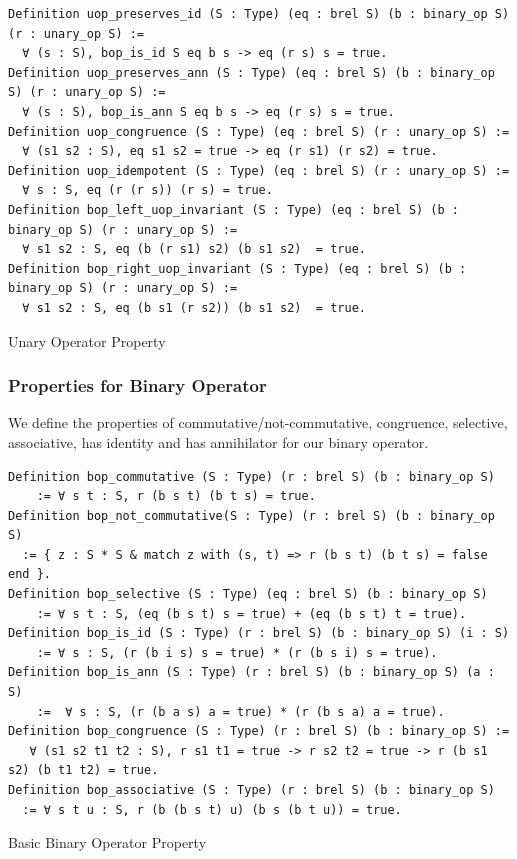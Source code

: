 \documentclass[a4paper,12pt,twoside,openright]{report}
\begin{document}
\begin{listing}[H]
\begin{verbatim}
Definition uop_preserves_id (S : Type) (eq : brel S) (b : binary_op S) (r : unary_op S) :=
  ∀ (s : S), bop_is_id S eq b s -> eq (r s) s = true.
Definition uop_preserves_ann (S : Type) (eq : brel S) (b : binary_op S) (r : unary_op S) :=
  ∀ (s : S), bop_is_ann S eq b s -> eq (r s) s = true.
Definition uop_congruence (S : Type) (eq : brel S) (r : unary_op S) := 
  ∀ (s1 s2 : S), eq s1 s2 = true -> eq (r s1) (r s2) = true. 
Definition uop_idempotent (S : Type) (eq : brel S) (r : unary_op S) := 
  ∀ s : S, eq (r (r s)) (r s) = true. 
Definition bop_left_uop_invariant (S : Type) (eq : brel S) (b : binary_op S) (r : unary_op S) :=
  ∀ s1 s2 : S, eq (b (r s1) s2) (b s1 s2)  = true.
Definition bop_right_uop_invariant (S : Type) (eq : brel S) (b : binary_op S) (r : unary_op S) :=
  ∀ s1 s2 : S, eq (b s1 (r s2)) (b s1 s2)  = true.
\end{verbatim}
\caption{Unary Operator Property} 
\label{coq:def:uop_properties}
\end{listing}

\subsubsection{Properties for Binary Operator}
We define the properties of commutative/not-commutative, congruence, selective, associative, has identity and has annihilator for our binary operator.

\begin{listing}[H]
\begin{verbatim}
Definition bop_commutative (S : Type) (r : brel S) (b : binary_op S) 
    := ∀ s t : S, r (b s t) (b t s) = true. 
Definition bop_not_commutative(S : Type) (r : brel S) (b : binary_op S) 
  := { z : S * S & match z with (s, t) => r (b s t) (b t s) = false end }.  
Definition bop_selective (S : Type) (eq : brel S) (b : binary_op S) 
    := ∀ s t : S, (eq (b s t) s = true) + (eq (b s t) t = true).    
Definition bop_is_id (S : Type) (r : brel S) (b : binary_op S) (i : S) 
    := ∀ s : S, (r (b i s) s = true) * (r (b s i) s = true).    
Definition bop_is_ann (S : Type) (r : brel S) (b : binary_op S) (a : S)
    :=  ∀ s : S, (r (b a s) a = true) * (r (b s a) a = true).    
Definition bop_congruence (S : Type) (r : brel S) (b : binary_op S) := 
   ∀ (s1 s2 t1 t2 : S), r s1 t1 = true -> r s2 t2 = true -> r (b s1 s2) (b t1 t2) = true.
Definition bop_associative (S : Type) (r : brel S) (b : binary_op S) 
  := ∀ s t u : S, r (b (b s t) u) (b s (b t u)) = true.
\end{verbatim}
\caption{Basic Binary Operator Property} 
\label{coq:def:binary_properties_basic}
\end{listing}
\end{document}
